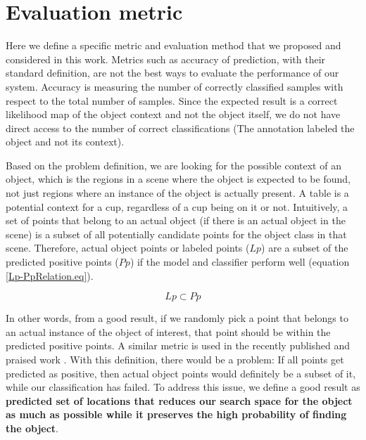 \section{Evaluation metric}
\label{EvaluationMetric.sec}


Here we define a specific metric and evaluation method that we proposed and considered in this work.
Metrics such as accuracy of prediction, with their standard definition, are not the best ways to evaluate the performance of our system.
Accuracy is measuring the number of correctly classified samples with respect to the total number of samples.
Since the expected result is a correct likelihood map of the object context and not the object itself, we do not have direct access to the number of correct classifications (The annotation labeled the object and not its context). 

Based on the problem definition, we are looking for the possible context of an object, which is the regions in a scene where the 
object is expected to be found, not just regions where an instance of the object is actually present. A table is a potential context for a cup, regardless of a cup being on it or not.   
Intuitively, a set of points that belong to an actual object (if there is an actual object in the scene) is a subset of all 
potentially candidate points for the object class in that scene.
Therefore, actual object points or labeled points ($Lp$) are a subset of the predicted positive points ($Pp$) if the model and classifier perform 
well (equation \ref{Lp-PpRelation.eq}).

\begin{equation}
 \label{Lp-PpRelation.eq}
 Lp \subset Pp
\end{equation}

In other words, from a good result, if we randomly pick a point that belongs to an actual instance of the object of interest, that point should be within the predicted positive points. A similar metric is used in the recently published and praised work \cite{aydemir2012_3Dcontext}.
With this definition, there would be a problem: If all points get predicted as positive, then actual object points would 
definitely be a subset of it, while our classification has failed.
To address this issue, we define a good result as \textbf {predicted set of locations that reduces our search space for the object as much as 
possible while it preserves the high probability of finding the object}.

